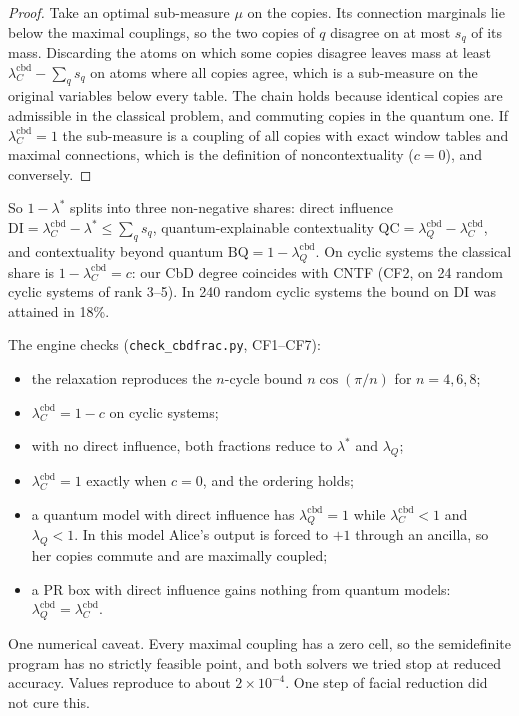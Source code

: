 \documentclass[11pt]{article}
\theoremstyle{definition}\newtheorem{definition}[theorem]{Definition}\newtheorem{remark}[theorem]{Remark}\newtheorem{example}[theorem]{Example}
\begin{document}
\begin{proof}
Take an optimal sub-measure $\mu$ on the copies. Its connection marginals lie below the maximal couplings, so the two copies of $q$
disagree on at most $s_q$ of its mass. Discarding the atoms on which some copies disagree leaves mass at least $\lambda_C^{\mathrm{cbd}}-
\sum_qs_q$ on atoms where all copies agree, which is a sub-measure on the original variables below every table. The chain holds because
identical copies are admissible in the classical problem, and commuting copies in the quantum one. If $\lambda_C^{\mathrm{cbd}}=1$ the
sub-measure is a coupling of all copies with exact window tables and maximal connections, which is the definition of noncontextuality
($c=0$), and conversely.
\end{proof}

So $1-\lambda^*$ splits into three non-negative shares: direct influence $\mathrm{DI}=\lambda_C^{\mathrm{cbd}}-\lambda^*\le\sum_qs_q$,
quantum-explainable contextuality $\mathrm{QC}=\lambda_Q^{\mathrm{cbd}}-\lambda_C^{\mathrm{cbd}}$, and contextuality beyond quantum
$\mathrm{BQ}=1-\lambda_Q^{\mathrm{cbd}}$. On cyclic systems the classical share is $1-\lambda_C^{\mathrm{cbd}}=c$: our CbD degree coincides
with CNTF (CF2, on 24 random cyclic systems of rank 3--5). In 240 random cyclic systems the bound on DI was attained in 18\%.

The engine checks (\texttt{check\_cbdfrac.py}, CF1--CF7):
\begin{itemize}
\item the relaxation reproduces the $n$-cycle bound $n\cos(\pi/n)$ for $n=4,6,8$;
\item $\lambda_C^{\mathrm{cbd}}=1-c$ on cyclic systems;
\item with no direct influence, both fractions reduce to $\lambda^*$ and $\lambda_Q$;
\item $\lambda_C^{\mathrm{cbd}}=1$ exactly when $c=0$, and the ordering holds;
\item a quantum model with direct influence has $\lambda_Q^{\mathrm{cbd}}=1$ while $\lambda_C^{\mathrm{cbd}}<1$ and $\lambda_Q<1$. In this
  model Alice's output is forced to $+1$ through an ancilla, so her copies commute and are maximally coupled;
\item a PR box with direct influence gains nothing from quantum models: $\lambda_Q^{\mathrm{cbd}}=\lambda_C^{\mathrm{cbd}}$.
\end{itemize}

One numerical caveat. Every maximal coupling has a zero cell, so the semidefinite program has no strictly feasible point, and both solvers
we tried stop at reduced accuracy. Values reproduce to about $2\times10^{-4}$. One step of facial reduction did not cure this.
\end{document}
